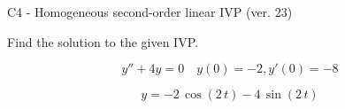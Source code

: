 \begin{exercise}
  \begin{exerciseTitle}C4 - Homogeneous second-order linear IVP (ver. 23)\end{exerciseTitle}
  \begin{exerciseStatement}
    
Find the solution to the given IVP.

    
\[y''+4y = 0 \hspace{1em} y(0) = -2 , y'(0) = -8\]

  \end{exerciseStatement}
  \begin{exerciseAnswer}
    
\[y= -2 \, \cos\left(2 \, t\right) - 4 \, \sin\left(2 \, t\right)\]

  \end{exerciseAnswer}
\end{exercise}